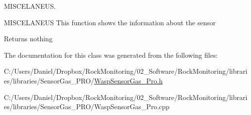 M\+I\+S\+C\+E\+L\+A\+N\+E\+US. 

M\+I\+S\+C\+E\+L\+A\+N\+E\+US This function shows the information about the sensor

\begin{DoxyReturn}{Returns}
nothing 
\end{DoxyReturn}


The documentation for this class was generated from the following files\+:\begin{DoxyCompactItemize}
\item 
C\+:/\+Users/\+Daniel/\+Dropbox/\+Rock\+Monitoring/02\+\_\+\+Software/\+Rock\+Monitoring/libraries/libraries/\+Sensor\+Gas\+\_\+\+P\+R\+O/\hyperlink{_wasp_sensor_gas___pro_8h}{Wasp\+Sensor\+Gas\+\_\+\+Pro.\+h}\item 
C\+:/\+Users/\+Daniel/\+Dropbox/\+Rock\+Monitoring/02\+\_\+\+Software/\+Rock\+Monitoring/libraries/libraries/\+Sensor\+Gas\+\_\+\+P\+R\+O/Wasp\+Sensor\+Gas\+\_\+\+Pro.\+cpp\end{DoxyCompactItemize}
